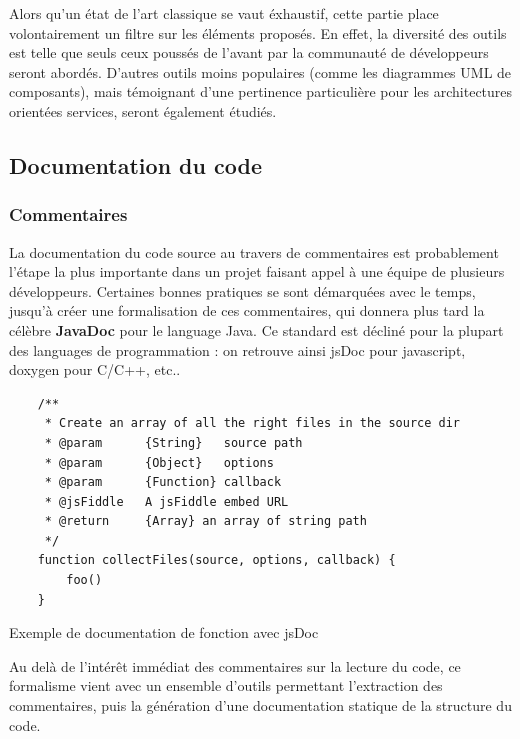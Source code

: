Alors qu'un état de l'art classique se vaut éxhaustif, cette partie place volontairement un filtre sur
les éléments proposés. En effet, la diversité des outils est telle que seuls ceux poussés de
l'avant par la communauté de développeurs seront abordés.
D'autres outils moins populaires (comme les diagrammes UML de composants), mais témoignant d'une pertinence
particulière pour les architectures orientées services, seront également étudiés.

\subsection{Documentation du code}
    \subsubsection{Commentaires}
La documentation du code source au travers de commentaires est probablement l'étape la plus
importante dans un projet faisant appel à une équipe de plusieurs développeurs.
Certaines bonnes pratiques se sont démarquées avec le temps, jusqu'à créer une formalisation de
ces commentaires, qui donnera plus tard la célèbre \textbf{JavaDoc} pour le language Java.
Ce standard est décliné pour la plupart des languages de programmation : on retrouve ainsi
jsDoc pour javascript, doxygen pour C/C++, etc..

\begin{listing}[ht]
    \begin{verbatim}
    /**
     * Create an array of all the right files in the source dir
     * @param      {String}   source path
     * @param      {Object}   options
     * @param      {Function} callback
     * @jsFiddle   A jsFiddle embed URL
     * @return     {Array} an array of string path
     */
    function collectFiles(source, options, callback) {
        foo()
    }
    \end{verbatim}
    \caption{Exemple de documentation de fonction avec jsDoc}
\end{listing}

Au delà de l'intérêt immédiat des commentaires sur la lecture du code, ce formalisme vient avec
un ensemble d'outils permettant l'extraction des commentaires, puis la génération d'une documentation
statique de la structure du code.

